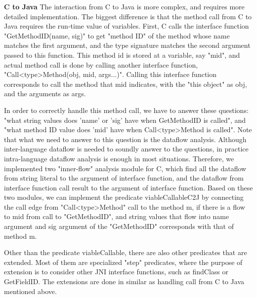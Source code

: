 \textbf{C to Java} The interaction from C to Java is more complex, and
requires more detailed implementation. The biggest difference is that
the method call from C to Java requires the run-time value of variables.
First, C calls the interface function "GetMethodID(name, sig)" to get "method
ID" of the method whose name matches the first argument, and the type signature
matches the second argument passed to this function. This method id is stored
at a variable, say "mid", and actual method call is done by calling another
interface function, "Call<type>Method(obj, mid, args...)". Calling this interface
function corresponds to call the method that mid indicates, with the "this object" as
obj, and the arguments as args.

In order to correctly handle this method call, we have to answer these
questions: "what string values does 'name' or 'sig' have when GetMethodID is
called", and "what method ID value does 'mid' have when Call<type>Method is
called". Note that what we need to answer to this question is the dataflow
analysis. Although inter-language dataflow is needed to soundly answer to the
questions, in practice intra-language dataflow analysis is enough in most
situations. Therefore, we implemented two "inner-flow" analysis module for C,
which find all the dataflow from string literal to the argument of interface
function, and the dataflow from interface function call result to the argument
of interface function. Based on these two modules, we can implement the
predicate viableCallableC2J by connecting the call edge from "Call<type>Method"
call to the method m, if there is a flow to mid from call to "GetMethodID", and
string values that flow into name argument and sig argument of the "GetMethodID"
corresponds with that of method m.

Other than the predicate viableCallable, there are also other predicates that
are extended. Most of them are specialized "step" predicates, where the purpose
of extension is to consider other JNI interface functions, such as
findClass or GetFieldID. The extensions are done in similar as handling
call from C to Java mentioned above.
